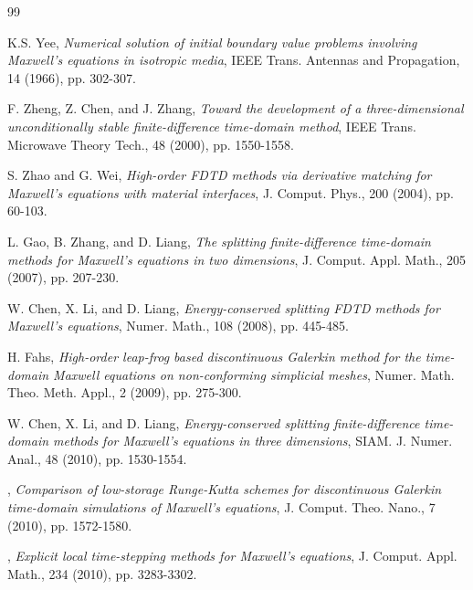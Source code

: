 \documentclass[10pt,reqno]{amsart}
\renewcommand{\(}{\left(}
\renewcommand{\)}{\right)}
\numberwithin{equation}{section}
\begin{document}
\begin{thebibliography}{99}


  {\sc K.S. Yee}, \emph{Numerical solution of initial boundary value problems involving Maxwell's equations in isotropic media}, IEEE Trans. Antennas and Propagation, 14 (1966), pp. 302-307.



  {\sc F. Zheng, Z. Chen, and J. Zhang}, \emph{Toward the development of a three-dimensional unconditionally stable finite-difference time-domain method}, IEEE Trans. Microwave Theory Tech.,
48 (2000), pp. 1550-1558.


  {\sc S. Zhao and G. Wei}, \emph{High-order FDTD methods via derivative matching for
	Maxwell's equations with material interfaces}, J. Comput. Phys., 200 (2004), pp. 60-103.

  {\sc L.  Gao, B. Zhang, and D. Liang}, \emph{The splitting finite-difference time-domain methods for Maxwell's equations in two dimensions}, J. Comput. Appl. Math., 205 (2007), pp. 207-230.


 {\sc W. Chen, X. Li, and D. Liang}, \emph{Energy-conserved splitting FDTD methods for Maxwell's equations}, Numer. Math., 108 (2008), pp. 445-485.



 {\sc H. Fahs}, \emph{High-order leap-frog based discontinuous Galerkin method for the time-domain Maxwell equations on non-conforming simplicial meshes}, Numer. Math. Theo. Meth. Appl., 2 (2009), pp.  275-300.

 {\sc W. Chen, X. Li, and D. Liang}, \emph{Energy-conserved splitting finite-difference time- domain methods for Maxwell's equations in three dimensions}, SIAM. J. Numer. Anal., 48 (2010), pp. 1530-1554.


, \emph{Comparison of low-storage Runge-Kutta schemes for discontinuous Galerkin time-domain simulations of Maxwell's equations}, J. Comput. Theo. Nano., 7 (2010), pp.  1572-1580.



, \emph{Explicit local time-stepping methods for Maxwell's equations}, J. Comput. Appl. Math., 234 (2010), pp.  3283-3302.



\end{thebibliography}
\end{document}
